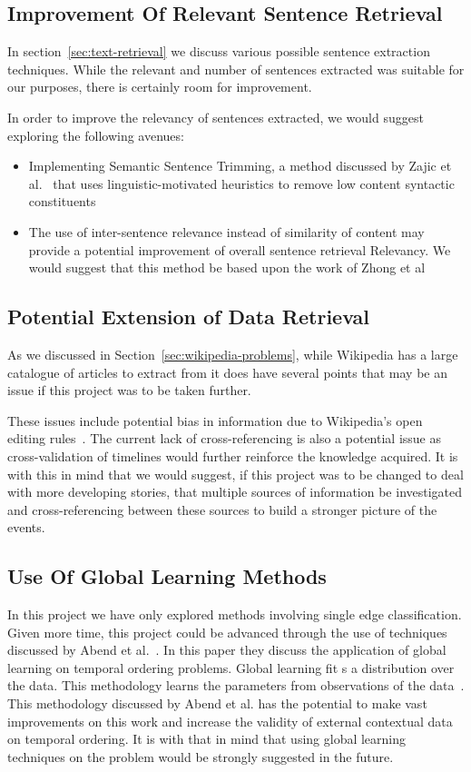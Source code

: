 \documentclass[bsc,frontabs,twoside,singlespacing,parskip,deptreport]{infthesis}     %
\begin{document}
\subsection{Improvement Of Relevant Sentence Retrieval}
In section~\ref{sec:text-retrieval} we discuss various possible sentence extraction techniques.
While the relevant and number of sentences extracted was suitable for our purposes, there is certainly room for improvement.

In order to improve the relevancy of sentences extracted, we would suggest exploring the following avenues:
\begin{itemize}
\item Implementing Semantic Sentence Trimming, a method discussed by Zajic et al.~\cite{zajic2005sentence} that
  uses linguistic-motivated heuristics to remove low content syntactic constituents 

\item The use of inter-sentence relevance instead of similarity of content may provide a potential improvement of
  overall sentence retrieval Relevancy. We would suggest that this method be based upon the work of Zhong et al~\cite{zhong2008practical}
\end{itemize}

\subsection{Potential Extension of Data Retrieval}
As we discussed in Section~\ref{sec:wikipedia-problems}, while Wikipedia has a large catalogue of articles to extract from
it does have several points that may be an issue if this project was to be taken further.

These issues include potential bias in information due to Wikipedia's open editing rules~\cite{wikipediaeditrules}. The current lack of
cross-referencing is also a potential issue as cross-validation of timelines would further reinforce the knowledge acquired.
It is with this in mind that we would suggest, if this project was to be changed to deal with more developing stories, that
multiple sources of  information be investigated and cross-referencing between these sources to build a stronger picture of
the events.


\subsection{Use Of Global Learning Methods}
In this project we have only explored methods involving single edge classification. Given more time,
this project could be advanced through the use of techniques discussed by Abend et al.~\cite{abend2015lexical}.
In this paper they discuss the application of global learning on temporal ordering problems. Global learning
fit s a distribution over the data. This methodology learns the parameters from observations of the data~\cite{Huang2008}.
This methodology discussed by Abend et al. has the potential to make vast improvements on this work and increase the validity
of external contextual data on temporal ordering. It is with that in mind that using global learning techniques on the problem
would be strongly suggested in the future.
\end{document}
